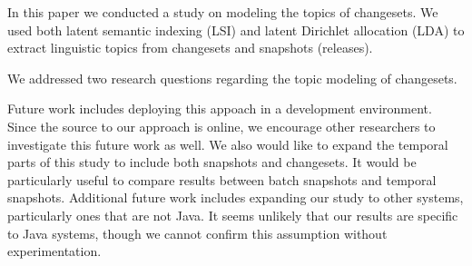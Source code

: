 
In this paper we conducted a study on modeling the topics of changesets.
We used both latent semantic indexing (LSI) and latent Dirichlet
allocation (LDA) to extract linguistic topics from changesets and
snapshots (releases).

We addressed two research questions regarding the topic modeling of changesets.


Future work includes deploying this appoach in a development environment.
Since the source to our approach is online, we encourage other researchers to
investigate this future work as well.  We also would like to expand the
temporal parts of this study to include both snapshots and changesets.  It
would be particularly useful to compare results between batch snapshots and
temporal snapshots.  Additional future work includes expanding our study to
other systems, particularly ones that are not Java.  It seems unlikely that our
results are specific to Java systems, though we cannot confirm this assumption
without experimentation.


